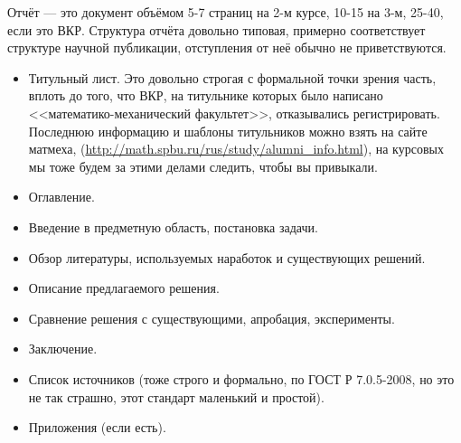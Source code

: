\documentclass[a5paper]{article}
\begin{document}
Отчёт --- это документ объёмом 5-7 страниц на 2-м курсе, 10-15 на 3-м, 25-40, если это ВКР. Структура отчёта довольно типовая, примерно соответствует структуре научной публикации, отступления от неё обычно не приветствуются.
\begin{itemize}
	\item Титульный лист. Это довольно строгая с формальной точки зрения часть, вплоть до того, что ВКР, на титульнике которых было написано <<математико-механический факультет>>, отказывались регистрировать. Последнюю информацию и шаблоны титульников можно взять на сайте матмеха, (\url{http://math.spbu.ru/rus/study/alumni_info.html}), на курсовых мы тоже будем за этими делами следить, чтобы вы привыкали.
	\item Оглавление.
	\item Введение в предметную область, постановка задачи.
	\item Обзор литературы, используемых наработок и существующих решений.
	\item Описание предлагаемого решения.
	\item Сравнение решения с существующими, апробация, эксперименты.
	\item Заключение.
	\item Список источников (тоже строго и формально, по ГОСТ Р 7.0.5-2008, но это не так страшно, этот стандарт маленький и простой).
	\item Приложения (если есть).
\end{itemize}
\end{document}
